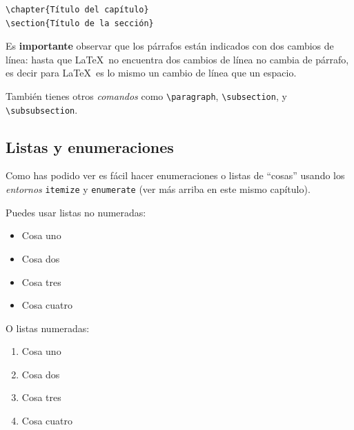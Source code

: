 \begin{verbatim}
\chapter{Título del capítulo}
\section{Título de la sección}
\end{verbatim}

Es \textbf{importante} observar que los párrafos están indicados con
dos cambios de línea: hasta que \LaTeX\ no encuentra dos cambios de
línea no cambia de párrafo, es decir para \LaTeX\ es lo mismo un
cambio de línea que un espacio.

También tienes otros \emph{comandos} como \verb|\paragraph|,
\verb|\subsection|, y \verb|\subsubsection|.

\subsection{Listas y enumeraciones}

Como has podido ver es fácil hacer enumeraciones o listas de ``cosas''
usando los \emph{entornos} \verb|itemize| y \verb|enumerate| (ver
más arriba en este mismo capítulo).

Puedes usar listas no numeradas:
\begin{itemize}
\item Cosa uno
\item Cosa dos
\item Cosa tres
\item Cosa cuatro
\end{itemize}

O listas numeradas:
\begin{enumerate}
\item Cosa uno
\item Cosa dos
\item Cosa tres
\item Cosa cuatro
\end{enumerate}


